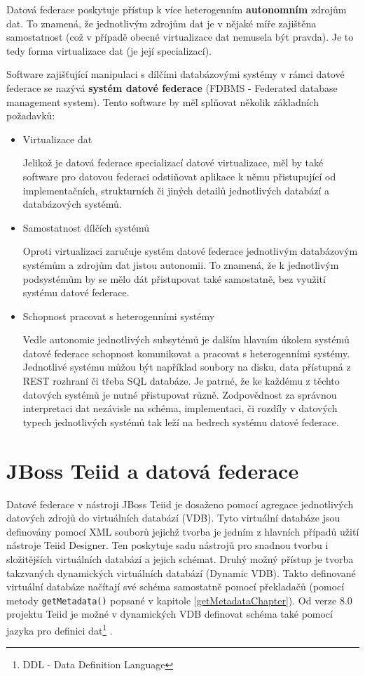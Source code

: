 \documentclass[oneside,12pt]{fithesis2}
\begin{document}
Datová federace poskytuje přístup k více heterogenním \textbf{autonomním} zdrojům dat. To znamená, že jednotlivým zdrojům dat je v nějaké míře zajištěna samostatnost (což v případě obecné virtualizace dat nemusela být pravda). Je to tedy forma virtualizace dat (je její specializací).

Software zajišťující manipulaci s dílčími databázovými systémy v rámci datové federace se nazývá \textbf{systém datové federace} (FDBMS - Federated database management system)\cite{fdbms}. Tento software by měl splňovat několik základních požadavků:
\begin{itemize}
 \item Virtualizace dat
 
 Jelikož je datová federace specializací datové virtualizace, měl by také software pro datovou federaci odstiňovat aplikace k němu přistupující od implementačních, strukturních či jiných detailů jednotlivých databází a databázových systémů.
 
 \item Samostatnost dílčích systémů
 
 Oproti  virtualizaci zaručuje systém datové federace jednotlivým databázovým systémům a zdrojům dat jistou autonomii. To znamená, že k jednotlivým podsystémům by se mělo dát přistupovat také samostatně, bez využití systému datové federace.
 
 \item Schopnost pracovat s heterogenními systémy
 
 Vedle autonomie jednotlivých subsytémů je dalším hlavním úkolem systémů datové federace schopnost komunikovat a pracovat s heterogenními systémy. Jednotlivé systému můžou být například soubory na disku, data přístupná z REST rozhraní či třeba SQL databáze. Je patrné, že ke každému z těchto datových systémů je nutné přistupovat různě. Zodpovědnost za správnou interpretaci dat nezávisle na schéma, implementaci, či rozdíly v datových typech jednotlivých systémů tak leží na bedrech systému datové federace.
\end{itemize} 

\section{JBoss Teiid a datová federace}
Datové federace v nástroji JBoss Teiid je dosaženo pomocí agregace jednotlivých datových zdrojů do virtuálních databází (VDB). Tyto virtuální databáze jsou definovány pomocí XML souborů jejichž tvorba je jedním z hlavních případů užití nástroje Teiid Designer. Ten poskytuje sadu nástrojů pro snadnou tvorbu i složitějších virtuálních databází a jejich schémat. Druhý možný přístup je tvorba takzvaných dynamických virtuálních databází (Dynamic VDB). Takto definované virtuální databáze načítají své schéma samostatně pomocí překladačů (pomocí metody \verb'getMetadata()' popsané v kapitole \ref{getMetadataChapter}). Od verze 8.0 projektu Teiid je možné v dynamických VDB definovat schéma také pomocí jazyka pro definici dat\footnote{DDL - Data Definition Language} \cite[Reference Guide$\rightarrow$VDBs$\rightarrow$DDL Metadata]{teiidDoc}.
\end{document}

